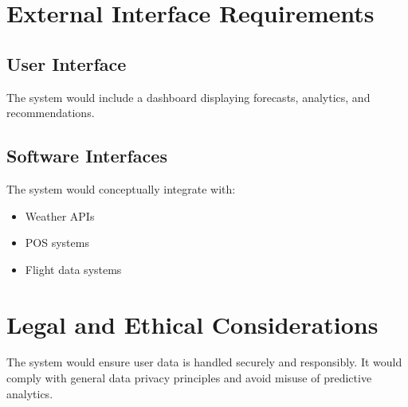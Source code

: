 \documentclass[12pt]{report}
\begin{document}
\section{External Interface Requirements}
\subsection{User Interface}
The system would include a dashboard displaying forecasts, analytics, and recommendations.

\subsection{Software Interfaces}
The system would conceptually integrate with:
\begin{itemize}
    \item Weather APIs
    \item POS systems
    \item Flight data systems
\end{itemize}

\section{Legal and Ethical Considerations}
The system would ensure user data is handled securely and responsibly. It would comply with general data privacy principles and avoid misuse of predictive analytics.
\end{document}
